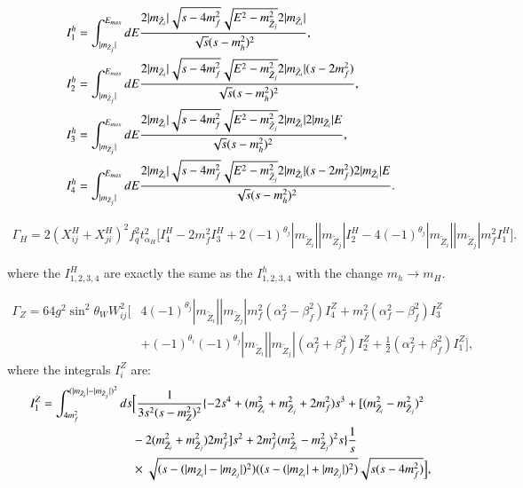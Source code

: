 \documentclass[final,3p,times,pdflatex]{elsarticle}
\begin{document}
\begin{align}
I_{1}^h &= \int_{|m_{\tilde{Z}_j}|}^{E_{max}} dE {2|m_{\tilde{Z}_i}|\sqrt{s-4 m_{f}^2} \sqrt{E^2 - m_{\tilde{Z}_j}^2}2|m_{\tilde{Z}_i}| \over \sqrt{s}(s-m_{h}^2)^2}, \\
I_{2}^h &= \int_{|m_{\tilde{Z}_j}|}^{E_{max}} dE {2|m_{\tilde{Z}_i}|\sqrt{s-4 m_{f}^2} \sqrt{E^2 - m_{\tilde{Z}_j}^2}2| m_{\tilde{Z}_i}| (s - 2 m_{f}^2) \over \sqrt{s}(s-m_{h}^2)^2}, \\
I_{3}^h &= \int_{|m_{\tilde{Z}_j}|}^{E_{max}} dE {2|m_{\tilde{Z}_i}|\sqrt{s-4 m_{f}^2} \sqrt{E^2 - m_{\tilde{Z}_j}^2}2|m_{\tilde{Z}_i}| 2|m_{\tilde{Z}_i}|E \over \sqrt{s}(s-m_{h}^2)^2}, \\
I_{4}^h &= \int_{|m_{\tilde{Z}_j}|}^{E_{max}} dE {2|m_{\tilde{Z}_i}|\sqrt{s-4 m_{f}^2} \sqrt{E^2 - m_{\tilde{Z}_j}^2}2|m_{\tilde{Z}_i}| (s - 2 m_{f}^2) 2|m_{\tilde{Z}_i}|E \over \sqrt{s}(s-m_{h}^2)^2}.
\end{align}

\begin{equation}
\begin{aligned}
\Gamma_H = 2(X_{ij}^H + X_{ji}^H)^2 f_{q}^2 t_{\alpha_H}^2 \Big[I_{4}^H - 2m_{f}^2 I_{3}^H + 2(-1)^{\theta_j}|m_{\tilde{Z}_i}||m_{\tilde{Z}_j}|I_{2}^H - 4(-1)^{\theta_j}|m_{\tilde{Z}_i}||m_{\tilde{Z}_j}|m_{f}^2 I_{1}^H\Big].
\end{aligned}
\end{equation}

where the $I_{1,2,3,4}^H$ are exactly the same as the $I_{1,2,3,4}^h$ with the change $m_{h} \rightarrow m_{H}$.

\begin{equation}
\begin{aligned}
\Gamma_Z = 64 g^2 \sin^2 \theta_W W_{ij}^2 \Big[ & 4(-1)^{\theta_j}|m_{\tilde{Z}_i}||m_{\tilde{Z}_j}|m_{f}^2(\alpha_{f}^2 - \beta_{f}^2)I_{4}^Z + m_{f}^2(\alpha_{f}^2 - \beta_{f}^2)I_{3}^Z \\ & + (-1)^{\theta_i}(-1)^{\theta_j}|m_{\tilde{Z}_i}||m_{\tilde{Z}_j}|(\alpha_{f}^2 + \beta_{f}^2)I_{2}^Z + \frac{1}{2}(\alpha_{f}^2 + \beta_{f}^2)I_{1}^Z\Big],
\end{aligned}
\end{equation}
where the integrals $I_{i}^Z$ are:
\begin{equation}
\begin{aligned}
I_{1}^Z = \int_{4m_{f}^2}^{(|m_{\tilde{Z}_i}| - |m_{\tilde{Z}_j}|)^2} ds & \Big[ {1 \over 3 s^2 (s-m_{Z}^2)^2} \{-2s^4 + (m_{\tilde{Z}_i}^2 + m_{\tilde{Z}_j}^2 + 2m_{f}^2)s^3 + [(m_{\tilde{Z}_i}^2 - m_{\tilde{Z}_j}^2)^2 \\ & - 2(m_{\tilde{Z}_i}^2 + m_{\tilde{Z}_j}^2)2m_{f}^2]s^2 + 2m_{f}^2 (m_{\tilde{Z}_i}^2 - m_{\tilde{Z}_j}^2)^2 s\}{1 \over s} \\ & \times \sqrt{(s-(|m_{\tilde{Z}_i}|-|m_{\tilde{Z}_j}|)^2)((s-(|m_{\tilde{Z}_i}|+|m_{\tilde{Z}_j}|)^2)}\sqrt{s(s-4m_{f}^2)} \Big],
\end{aligned}
\end{equation}
\end{document}

